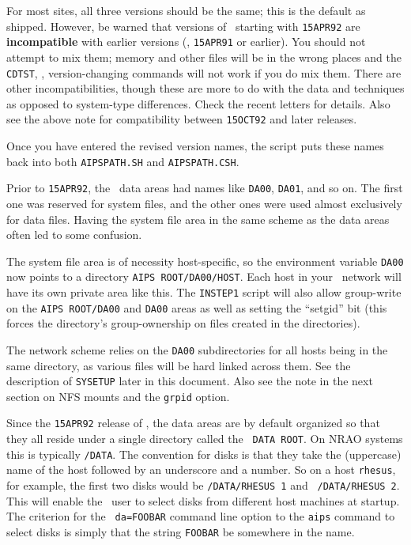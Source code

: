For most sites, all three versions should be the same; this is the
default as shipped.  However, be warned that versions of \AIPS\ starting
with {\tt 15APR92} are {\bf incompatible} with earlier versions (\ie,
{\tt 15APR91} or earlier).  You should not attempt to mix them; memory
and other files will be in the wrong places and the {\tt\dol CDTST}, \etc,
version-changing commands will not work if you do mix them.  There are
other incompatibilities, though these are more to do with the data and
techniques as opposed to system-type differences.  Check the recent
\AIPS letters for details.  Also see the above note for compatibility
between {\tt 15OCT92} and later releases.

Once you have entered the revised version names, the script puts these
names back into both {\tt AIPSPATH.SH} and {\tt AIPSPATH.CSH}. \medskip


Prior to {\tt 15APR92}, the \AIPS\ data areas had names like {\tt DA00},
{\tt DA01}, and so on.  The first one was reserved for system files, and
the other ones were used almost exclusively for data files.  Having the
system file area in the same scheme as the data areas often led to some
confusion.

The system file area is of necessity host-specific, so the environment
variable {\tt\dol DA00} now points to a directory {\tt\dol AIPS
ROOT/DA00/\dol HOST}.  Each host in your \AIPS\ network will have its own
private area like this.  The {\tt INSTEP1} script will also allow
group-write on the {\tt\dol AIPS ROOT/DA00} and {\tt\dol DA00}
areas as well as setting the ``setgid'' bit (this forces the directory's
group-ownership on files created in the directories).

The network scheme relies on the {\tt\dol DA00} subdirectories for all
hosts being in the same directory, as various files will be hard
linked across them.  See the description of {\tt SYSETUP} later in
this document.  Also see the note in the next section
on NFS mounts and the {\tt grpid} option.

\medskip{}

Since the {\tt 15APR92} release of \AIPS, the data areas are by default
organized so that they all reside under a single directory called the {\tt
DATA ROOT}.  On NRAO systems this is typically {\tt /DATA}.  The
convention for disks is that they take the (uppercase) name of the host
followed by an underscore and a number.  So on a host {\tt rhesus}, for
example, the first two disks would be {\tt /DATA/RHESUS 1} and {\tt
/DATA/RHESUS 2}.  This will enable the \AIPS\ user to select disks
from different host machines at startup.  The criterion for the {\tt
da=FOOBAR} command line option to the {\tt aips} command to select disks
is simply that the string {\tt FOOBAR} be somewhere in the name.

